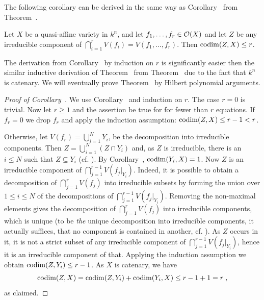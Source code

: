\documentclass[a4paper,parskip=half,numbers=enddot, DIV=12]{scrreprt}
\begin{document}
The following corollary can be derived in the same way as Corollary~ from Theorem~.
\begin{cor}
    Let $X$ be a quasi-affine variety in $k^n$, and let $f_1,\ldots,f_r\in \mathcal{O}(X)$ and let $Z$ be any irreducible component of $\bigcap_{i=1}^r V(f_i)=V(f_1,\ldots,f_r)$. Then $\operatorname{codim}(Z,X)\leq r$.
\end{cor}
The derivation from Corollary~ by induction on $r$ is significantly easier then the similar inductive derivation of Theorem~ from Theorem~ due to the fact that $k^n$ is catenary. We will eventually prove Theorem~ by Hilbert polynomial arguments.
\begin{proof}[Proof of Corollary~]
    We use Corollary~ and induction on $r$. The case $r=0$ is trivial. Now let $r\geq1$ and the assertion be true for for fewer than $r$ equations. If $f_r=0$ we drop $f_r$ and apply the induction assumption: $\operatorname{codim}(Z,X) \leq r-1< r $. 
    
    Otherwise, let $V(f_r) = \bigcup_{i=1}^N Y_i$, be the decomposition into irreducible components. Then $Z=\bigcup_{i=1}^N (Z\cap Y_i)$ and, as $Z$ is irreducible, there is an $i\leq N$ such that $Z\subseteq Y_i$ (cf. \cite[Proposition~2.1.1]{alg1}). By Corollary~, $\operatorname{codim}(Y_i,X) = 1$. Now $Z$ is an irreducible component of $ \bigcap_{j=1}^{r-1} V(f_j|_{Y_i})$. Indeed, it is possible to obtain a decomposition of $\bigcap_{j=1}^r V(f_j)$ into irreducible subsets by forming the union over $1\leq i\leq N$ of the decompositions of $ \bigcap_{j=1}^{r-1} V(f_j|_{Y_i})$. Removing the non-maximal elements gives the decomposition of $\bigcap_{j=1}^r V(f_j)$ into irreducible components, which is unique (to be \emph{the} unique decomposition into irreducible components, it actually suffices, that no component is contained in another, cf. \cite[Proposition~2.1.1]{alg1}). As $Z$ occurs in it, it is not a strict subset of any irreducible component of $\bigcap_{j=1}^{r-1} V(f_j|_{Y_i})$, hence it is an irreducible component of that. Applying the induction assumption we obtain $\operatorname{codim}(Z,Y_i)\leq r-1$. As $X$ is catenary, we have
    \begin{align*}
        \operatorname{codim}(Z,X) = \operatorname{codim}(Z,Y_i) +\operatorname{codim}(Y_i, X) \leq r-1+1 = r\;,
    \end{align*}
    as claimed.
\end{proof}
\end{document}
